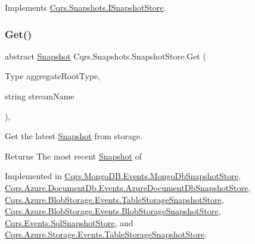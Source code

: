 Implements \hyperlink{interfaceCqrs_1_1Snapshots_1_1ISnapshotStore_a25efb06a4a6fcc9246d4572777c95dd5_a25efb06a4a6fcc9246d4572777c95dd5}{Cqrs.\+Snapshots.\+I\+Snapshot\+Store}.

\mbox{\label{classCqrs_1_1Snapshots_1_1SnapshotStore_ab2ecab1a665c0f2097929d028fe4ac69_ab2ecab1a665c0f2097929d028fe4ac69}} 
\subsubsection{\texorpdfstring{Get()}{Get()}\hspace{0.1cm}{\footnotesize\ttfamily [2/2]}}
{\footnotesize\ttfamily abstract \hyperlink{classCqrs_1_1Snapshots_1_1Snapshot}{Snapshot} Cqrs.\+Snapshots.\+Snapshot\+Store.\+Get (\begin{DoxyParamCaption}\item[{Type}]{aggregate\+Root\+Type,  }\item[{string}]{stream\+Name }\end{DoxyParamCaption})\hspace{0.3cm}{\ttfamily [protected]}, {}}



Get the latest \hyperlink{classCqrs_1_1Snapshots_1_1Snapshot}{Snapshot} from storage. 

\begin{DoxyReturn}{Returns}
The most recent \hyperlink{classCqrs_1_1Snapshots_1_1Snapshot}{Snapshot} of
\end{DoxyReturn}


Implemented in \hyperlink{classCqrs_1_1MongoDB_1_1Events_1_1MongoDbSnapshotStore_acb01680aad8c2671206bc851da17a036_acb01680aad8c2671206bc851da17a036}{Cqrs.\+Mongo\+D\+B.\+Events.\+Mongo\+Db\+Snapshot\+Store}, \hyperlink{classCqrs_1_1Azure_1_1DocumentDb_1_1Events_1_1AzureDocumentDbSnapshotStore_ac924659cdf14b06e31c57e4b1107b739_ac924659cdf14b06e31c57e4b1107b739}{Cqrs.\+Azure.\+Document\+Db.\+Events.\+Azure\+Document\+Db\+Snapshot\+Store}, \hyperlink{classCqrs_1_1Azure_1_1BlobStorage_1_1Events_1_1TableStorageSnapshotStore_a169361a7fbf413fed660609f66d95e13_a169361a7fbf413fed660609f66d95e13}{Cqrs.\+Azure.\+Blob\+Storage.\+Events.\+Table\+Storage\+Snapshot\+Store}, \hyperlink{classCqrs_1_1Azure_1_1BlobStorage_1_1Events_1_1BlobStorageSnapshotStore_a0d5d8af1e7e243d05ccc064b532bee2b_a0d5d8af1e7e243d05ccc064b532bee2b}{Cqrs.\+Azure.\+Blob\+Storage.\+Events.\+Blob\+Storage\+Snapshot\+Store}, \hyperlink{classCqrs_1_1Events_1_1SqlSnapshotStore_a074064fc96d192dd6f68be2bb941bb9f_a074064fc96d192dd6f68be2bb941bb9f}{Cqrs.\+Events.\+Sql\+Snapshot\+Store}, and \hyperlink{classCqrs_1_1Azure_1_1Storage_1_1Events_1_1TableStorageSnapshotStore_ac552ed9e69ca9ce8bbd9f14b4ecb546f_ac552ed9e69ca9ce8bbd9f14b4ecb546f}{Cqrs.\+Azure.\+Storage.\+Events.\+Table\+Storage\+Snapshot\+Store}.

